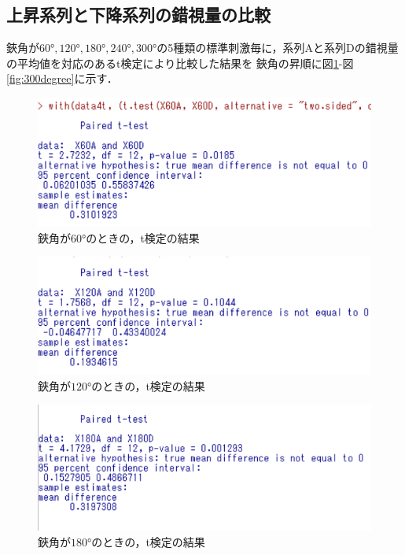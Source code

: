 \documentclass{jlreq}
\numberwithin{equation}{section}
\begin{document}
\subsection{上昇系列と下降系列の錯視量の比較}
鋏角が$60\si{\degree}, 120\si{\degree}, 180\si{\degree}, 240\si{\degree}, 300\si{\degree}$の5種類の標準刺激毎に，系列Aと系列Dの錯視量の平均値を対応のあるt検定により比較した結果を
鋏角の昇順に図\ref{fig:60degree}-図\ref{fig:300degree}に示す．

\begin{figure}[H]
  \centering
  \includegraphics{image/60degree.png}
  \caption{鋏角が$60\si{\degree}$のときの，t検定の結果}
  \label{fig:60degree}
\end{figure}

\begin{figure}[H]
  \centering
  \includegraphics{image/120degree.png}
  \caption{鋏角が$120\si{\degree}$のときの，t検定の結果}
  \label{fig:120degree}
\end{figure}

\begin{figure}[H]
  \centering
  \includegraphics{image/180degree.png}
  \caption{鋏角が$180\si{\degree}$のときの，t検定の結果}
  \label{fig:180degree}
\end{figure}
\end{document}
